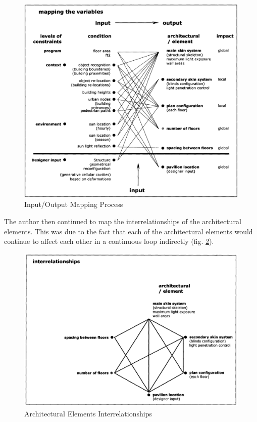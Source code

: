 \begin{figure}[htbp]
\centering
\includegraphics[width=\textwidth]{./Images/10-MapProcs}
\caption[Input/Output Mapping Process]{Input/Output Mapping Process \cite{zulas04}}
\label{fig:MapProcs}
\end{figure}

The author then continued to map the interrelationships of the architectural elements. This was due to the fact that each of the architectural elements would continue to affect each other in a continuous loop indirectly (fig. \ref{fig:ArchElmLoop}).

\begin{figure}[htbp]
\centering
\includegraphics[width=\textwidth]{./Images/11-ArchElmLoop}
\caption[Architectural Elements Interrelationships]{Architectural Elements Interrelationships \cite{zulas04}}
\label{fig:ArchElmLoop}
\end{figure}

